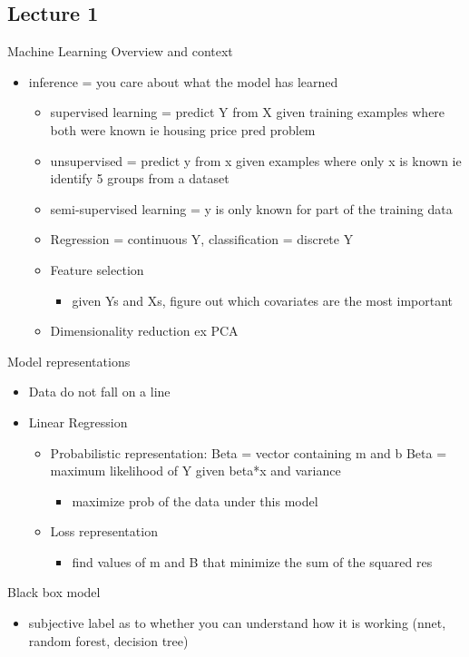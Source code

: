 \documentclass[a4paper]{article}
\begin{document}
\subsection{Lecture 1}
\label{sec:orgf7202cf}
Machine Learning Overview and context
\begin{itemize}
\item inference = you care about what the model has learned
\begin{itemize}
\item supervised learning = predict Y from X given training examples where both were known ie housing price pred problem
\item unsupervised = predict y from x given examples where only x is known ie identify 5 groups from a dataset
\item semi-supervised learning = y is only known for part of the training data
\item Regression = continuous Y, classification = discrete Y
\item Feature selection
\begin{itemize}
\item given Ys and Xs, figure out which covariates are the most important
\end{itemize}
\item Dimensionality reduction ex PCA
\end{itemize}
\end{itemize}
Model representations
\begin{itemize}
\item Data do not fall on a line
\item Linear Regression
\begin{itemize}
\item Probabilistic representation:
Beta = vector containing m and b
Beta = maximum likelihood of Y given beta*x and variance
\begin{itemize}
\item maximize prob of the data under this model
\end{itemize}
\item Loss representation
\begin{itemize}
\item find values of m and B that minimize the sum of the squared res
\end{itemize}
\end{itemize}
\end{itemize}
Black box model
\begin{itemize}
\item subjective label as to whether you can understand how it is working (nnet, random forest, decision tree)
\end{itemize}
\end{document}
